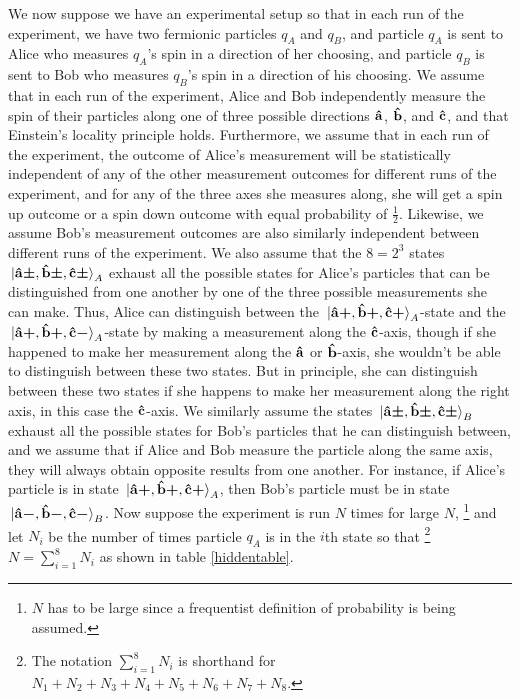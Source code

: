 \documentclass[letter, 12pt]{turabian-thesis}
\theoremstyle{hypothesis}
\newcommand{\uvb}[1]{\vb{\hat{{#1}}}}
\newcommand{\uvbp}[1]{\uvb{#1}\bm{+}}
\newcommand{\uvbm}[1]{\uvb{#1}\bm{-}}
\newcommand{\uvbpm}[1]{\uvb{#1}\bm{\pm}}
\let\origfootnote\footnote %
\renewcommand{\footnote}[1]{%
\noindent %
\origfootnote{#1}}
\begin{document}
We now suppose we have an experimental setup so that in each run of the experiment, we have two fermionic particles $q_A$ and $q_B$,  and particle $q_A$ is sent to Alice who measures $q_A$'s spin in a direction of her choosing, and particle $q_B$ is sent to Bob who measures $q_B$'s spin in a direction of his choosing. We assume that in each run of the experiment, Alice and Bob independently measure the spin of their particles along one of three possible directions $\uvb{a}$, $\uvb{b}$, and $\uvb{c}$, and that Einstein's locality principle holds. Furthermore, we assume that in each run of the experiment, the outcome of Alice's measurement will be statistically independent of any of the other measurement outcomes for different runs of the experiment, and for any of the three axes she measures along, she will get a spin up outcome or a spin down outcome with equal probability of $\frac{1}{2}.$ Likewise, we assume Bob's measurement outcomes are also similarly independent between different runs of the experiment. We also assume that the $8=2^3$ states $\ket*{\uvbpm{a},\uvbpm{b},\uvbpm{c}}_A$ exhaust all the possible states for Alice's particles that can be distinguished from one another by one of the three possible measurements she can make. Thus, Alice can distinguish between the $\ket*{\uvbp{a},\uvbp{b},\uvbp{c}}_A$-state and the $\ket*{\uvbp{a},\uvbp{b},\uvbm{c}}_A$-state by making a measurement along the $\uvb{c}$-axis, though if she happened to make her measurement along the $\uvb{a}$ or $\uvb{b}$-axis, she wouldn't be able to distinguish between these two states. But in principle, she can distinguish between these two states if she happens to make her measurement along the right axis, in this case the $\uvb{c}$-axis. We similarly assume the states $\ket*{\uvbpm{a},\uvbpm{b},\uvbpm{c}}_B$  exhaust all the possible states for Bob's particles that he can distinguish between, and we assume that if Alice and Bob measure the particle along the same axis, they will always obtain opposite results from one another. For instance, if Alice's particle is in state $\ket*{\uvbp{a},\uvbp{b},\uvbp{c}}_A$, then Bob's particle must be in state $\ket*{\uvbm{a},\uvbm{b},\uvbm{c}}_B$. Now suppose the experiment is run $N$ times for large $N$,\footnote{$N$ has to be large since a frequentist definition of probability is being assumed.} and let $N_i$ be the number of times particle $q_A$ is in the $i$th state so that\footnote{The notation $\sum_{i=1}^8 N_i$ is shorthand for $N_1+N_2+N_3+N_4+N_5+N_6+N_7+N_8$.} $N=\sum_{i=1}^8 N_i$ as shown in table \ref{hiddentable}.
\end{document}
